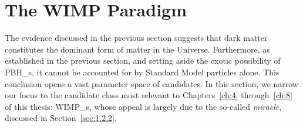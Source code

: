 
\section{The WIMP Paradigm}
\label{sec:1.2}

The evidence discussed in the previous section suggests that dark matter constitutes the dominant form of matter in the Universe. Furthermore, as established in the previous section, and setting aside the exotic possibility of \glspl{PBH_}, it cannot be accounted for by Standard Model particles alone.
This conclusion opens a vast parameter space of candidates.
%
%
In this section, we narrow our focus to the candidate class most relevant to Chapters~\ref{ch:4} through~\ref{ch:8} of this thesis: \glspl{WIMP_}, whose appeal is largely due to the so-called \emph{\WIMP miracle}, discussed in Section~\ref{sec:1.2.2}.

